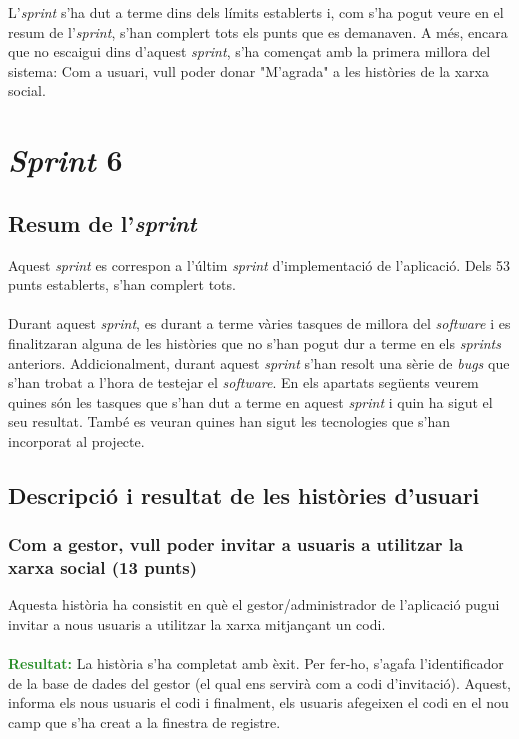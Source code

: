 \documentclass[11pt,catalan,listoffigures,listoftables]{tfgetsinf}
\begin{document}
L'\textit{sprint} s'ha dut a terme dins dels límits establerts i, com s'ha pogut veure en el resum de l'\textit{sprint}, s'han complert tots els punts que es demanaven. A més, encara que no escaigui dins d'aquest \textit{sprint}, s'ha començat amb la primera millora del sistema: Com a usuari, vull poder donar "M'agrada" a les històries de la xarxa social.

\section{\textit{Sprint} 6}

\subsection{Resum de l'\textit{sprint}}

Aquest \textit{sprint} es correspon a l'últim \textit{sprint} d'implementació de l'aplicació. Dels 53 punts establerts, s'han complert tots.\\ \\
Durant aquest \textit{sprint}, es durant a terme vàries tasques de millora del \textit{software} i es finalitzaran alguna de les històries que no s'han pogut dur a terme en els \textit{sprints} anteriors. Addicionalment, durant aquest \textit{sprint} s'han resolt una sèrie de \textit{bugs} que s'han trobat a l'hora de testejar el \textit{software}.
En els apartats següents veurem quines són les tasques que s'han dut a terme en aquest \textit{sprint} i quin ha sigut el seu resultat. També es veuran quines han sigut les tecnologies que s'han incorporat al projecte.

\subsection{Descripció i resultat de les històries d'usuari}

\subsubsection{Com a gestor, vull poder invitar a usuaris a utilitzar la xarxa social (13 punts)}

Aquesta història ha consistit en què el gestor/administrador de l'aplicació pugui invitar a nous usuaris a utilitzar la xarxa mitjançant un codi.\\ \\
\textcolor{forestgreen}{\textbf{Resultat:}} La història s'ha completat amb èxit. Per fer-ho, s'agafa l'identificador de la base de dades del gestor (el qual ens servirà com a codi d'invitació). Aquest, informa els nous usuaris el codi i finalment, els usuaris afegeixen el codi en el nou camp que s'ha creat a la finestra de registre.
\end{document}

